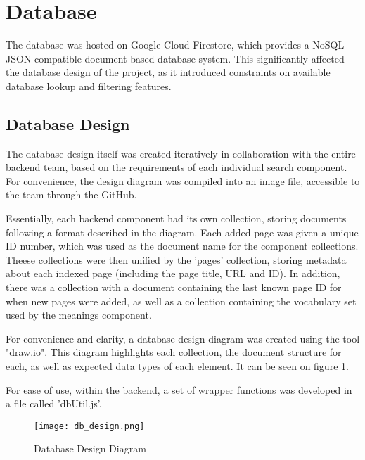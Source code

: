 \section{Database}

The database was hosted on Google Cloud Firestore, which provides a NoSQL JSON-compatible document-based database system. This significantly affected the database design of the project, as it introduced constraints on available database lookup and filtering features.

\subsection{Database Design}

The database design itself was created iteratively in collaboration with the entire backend team, based on the requirements of each individual search component. For convenience, the design diagram was compiled into an image file, accessible to the team through the GitHub.

Essentially, each backend component had its own collection, storing documents following a format described in the diagram. Each added page was given a unique ID number, which was used as the document name for the component collections. Theese collections were then unified by the 'pages' collection, storing metadata about each indexed page (including the page title, URL and ID). In addition, there was a collection with a document containing the last known page ID for when new pages were added, as well as a collection containing the vocabulary set used by the meanings component.

For convenience and clarity, a database design diagram was created using the tool "draw.io". This diagram highlights each collection, the document structure for each, as well as expected data types of each element. It can be seen on figure \ref{fig:db_design}.

For ease of use, within the backend, a set of wrapper functions was developed in a file called 'dbUtil.js'.

\newpage
\begin{figure}[!hb]
    \texttt{[image: db\_design.png]}\\
    \caption{Database Design Diagram}
    \label{fig:db_design}
\end{figure}
\newpage


